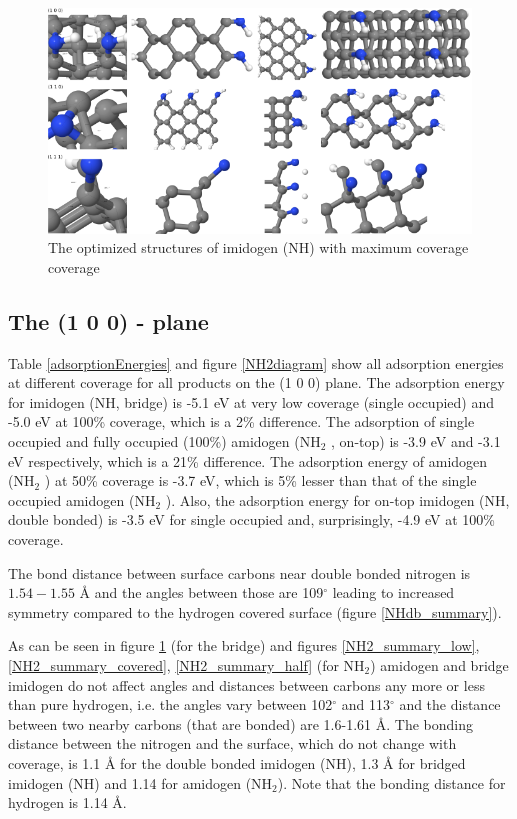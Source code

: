\documentclass[12pt,a4paper]{article}
\begin{document}
\begin{figure} \captionsetup{width=.8\linewidth} \caption{The optimized structures of imidogen (NH) with maximum coverage coverage} \label{NHbridge_summary}
%
\includegraphics[width=.8\linewidth]{pictures/NHbridge_summary.png}
\end{figure}


\subsection{The (1 0 0) - plane}
Table \ref{adsorptionEnergies} and figure \ref{NH2diagram} show all adsorption energies at different coverage for all products on the (1 0 0) plane. The adsorption energy for imidogen (NH, bridge) is -5.1 eV at very low coverage (single occupied) and -5.0 eV at 100\% coverage, which is a 2\% difference. The adsorption of single occupied and fully occupied (100\%) amidogen (NH$_2$ , on-top) is -3.9 eV and -3.1 eV respectively, which is a 21\% difference. The adsorption energy of amidogen (NH$_2$ ) at 50\% coverage is -3.7 eV, which is 5\% lesser than that of the single occupied amidogen (NH$_2$ ). Also, the adsorption energy for on-top imidogen (NH, double bonded) is -3.5 eV for single occupied and, surprisingly, -4.9 eV at 100\% coverage. 

The bond distance between surface carbons near double bonded nitrogen is $1.54-1.55$ Å and the angles between those are 109$^{\circ}$ leading to increased symmetry compared to the hydrogen covered surface (figure \ref{NHdb_summary}).

As can be seen in figure \ref{NHbridge_summary} (for the bridge) and figures \ref{NH2_summary_low},   \ref{NH2_summary_covered}, \ref{NH2_summary_half} (for NH$_2$) amidogen and bridge imidogen do not affect angles and distances between carbons  any more or less than pure hydrogen, i.e. the angles vary between 102$^{\circ}$ and 113$^{\circ}$ and the distance between two nearby carbons (that are bonded) are 1.6-1.61 Å.  The bonding distance between the nitrogen and the surface, which do not change with coverage, is 1.1 Å for the double bonded imidogen (NH), 1.3 Å for bridged imidogen (NH) and 1.14 for amidogen (NH$_2$). Note that the bonding distance for hydrogen is 1.14 Å.
\end{document}
